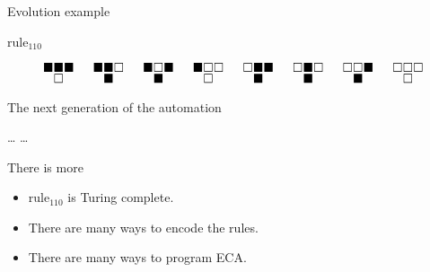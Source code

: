 \documentclass[presentation,aspectratio=169,smaller]{beamer}
\begin{document}
\begin{frame}[label={sec:org3545853},t]{Evolution example}
\begin{onlyenv}
\(\text{rule}_{110}\)

\begin{equation*}
  \begingroup
  \setlength\arraycolsep{0.25pt}
  \renewcommand{\arraystretch}{0.5}
  \begin{matrix}
    \blacksquare & \blacksquare & \blacksquare \\
    & \square &
  \end{matrix}\mspace{28mu}
  \begin{matrix}
    \blacksquare & \blacksquare & \square \\
    & \blacksquare &
  \end{matrix}\mspace{28mu}
  \begin{matrix}
    \blacksquare & \square & \blacksquare \\
    & \blacksquare &
  \end{matrix}\mspace{28mu}
  \begin{matrix}
    \blacksquare & \square & \square \\
    & \square &
  \end{matrix}\mspace{28mu}
  \begin{matrix}
    \square & \blacksquare & \blacksquare \\
    & \blacksquare &
  \end{matrix}\mspace{28mu}
  \begin{matrix}
    \square & \blacksquare & \square \\
    & \blacksquare &
  \end{matrix}\mspace{28mu}
  \begin{matrix}
    \square & \square & \blacksquare \\
    & \blacksquare &
  \end{matrix}\mspace{28mu}
  \begin{matrix}
    \square & \square & \square \\
    & \square &
  \end{matrix}
  \endgroup
\end{equation*}

The next generation of the automation

\hfill \dots
\blacksquare
\blacksquare
\blacksquare
\square
\square
\square
\blacksquare
\dots \hfill
\end{onlyenv}
\end{frame}

\begin{frame}[label={sec:orgac15324}]{There is more}
\begin{itemize}
\item \(\text{rule}_{110}\) is Turing complete.
\item There are many ways to encode the rules.
\item There are many ways to program ECA.
\end{itemize}
\end{frame}
\end{document}

